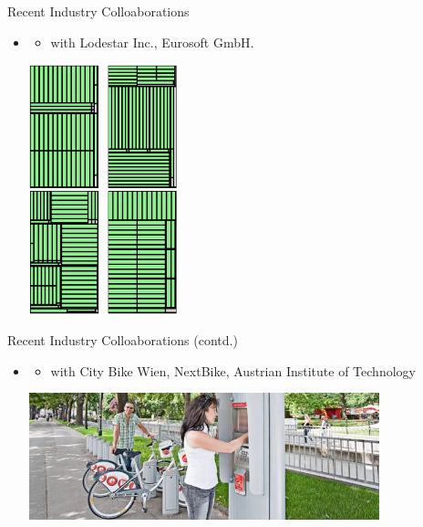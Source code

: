 \documentclass[aspectratio=1610]{beamer}
\begin{document}
\begin{frame}{Recent Industry Colloaborations}
\begin{itemize}
\itemsep3.5ex
	\item {}
	\begin{itemize}
	\item with Lodestar Inc., Eurosoft GmbH.
	\end{itemize} 

	\bigskip
	\includegraphics[width=0.34\textwidth, angle=90]{graphics/cutting_example.png}
\end{itemize}  
\end{frame}


\begin{frame}{Recent Industry Colloaborations (contd.)}
	\begin{itemize}
	\itemsep3.5ex
		\item {}
		\begin{itemize}
		\item with City Bike Wien, NextBike, Austrian Institute of Technology
		\end{itemize} 
	
		\bigskip
		\includegraphics[width=0.8\textwidth]{graphics/BBSS.jpg}
	\end{itemize}  
\end{frame}
	
\end{document}
